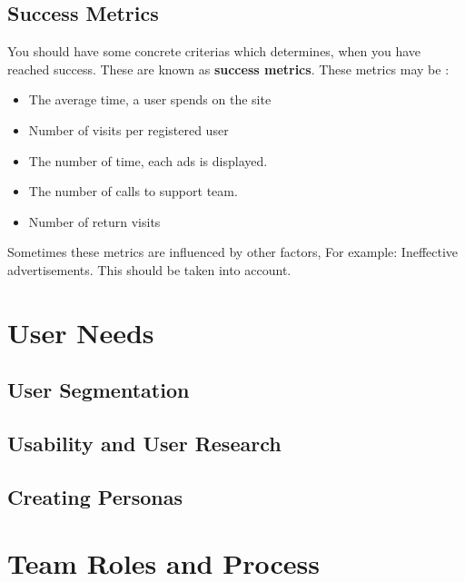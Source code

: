 \subsection{Success Metrics}
    You should have some concrete criterias which determines, when you have reached success. These are known as \textbf{success metrics}. These metrics may be :
    \begin{itemize}
        \item The average time, a user spends on the site
        \item Number of visits per registered user
        \item The number of time, each ads is displayed.
        \item The number of calls to support team.
        \item Number of return visits
    \end{itemize}
    Sometimes these metrics are influenced by other factors, For example: Ineffective advertisements. This should be taken into account.
\section{User Needs}
\subsection{User Segmentation}
\subsection{Usability and User Research}
\subsection{Creating Personas}
\section{Team Roles and Process}
